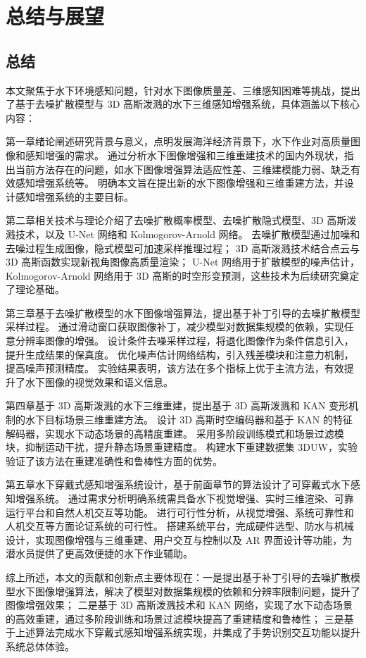 \chapter{总结与展望}
\section{总结}
本文聚焦于水下环境感知问题，针对水下图像质量差、三维感知困难等挑战，提出了基于去噪扩散模型与 3D 高斯泼溅的水下三维感知增强系统，具体涵盖以下核心内容：

第一章绪论阐述研究背景与意义，点明发展海洋经济背景下，水下作业对高质量图像和感知增强的需求。
通过分析水下图像增强和三维重建技术的国内外现状，指出当前方法存在的问题，如水下图像增强算法适应性差、三维建模能力弱、缺乏有效感知增强系统等。
明确本文旨在提出新的水下图像增强和三维重建方法，并设计感知增强系统的主要目标。

第二章相关技术与理论介绍了去噪扩散概率模型、去噪扩散隐式模型、3D 高斯泼溅技术，以及 U-Net 网络和 Kolmogorov-Arnold 网络。
去噪扩散模型通过加噪和去噪过程生成图像，隐式模型可加速采样推理过程；
3D 高斯泼溅技术结合点云与 3D 高斯函数实现新视角图像高质量渲染；
U-Net 网络用于扩散模型的噪声估计，Kolmogorov-Arnold 网络用于 3D 高斯的时空形变预测，这些技术为后续研究奠定了理论基础。

第三章基于去噪扩散模型的水下图像增强算法，提出基于补丁引导的去噪扩散模型采样过程。
通过滑动窗口获取图像补丁，减少模型对数据集规模的依赖，实现任意分辨率图像的增强。
设计条件去噪采样过程，将退化图像作为条件信息引入，提升生成结果的保真度。
优化噪声估计网络结构，引入残差模块和注意力机制，提高噪声预测精度。
实验结果表明，该方法在多个指标上优于主流方法，有效提升了水下图像的视觉效果和语义信息。

第四章基于 3D 高斯泼溅的水下三维重建，提出基于 3D 高斯泼溅和 KAN 变形机制的水下目标场景三维重建方法。
设计 3D 高斯时空编码器和基于 KAN 的特征解码器，实现水下动态场景的高精度重建。
采用多阶段训练模式和场景过滤模块，抑制运动干扰，提升静态场景重建精度。
构建水下重建数据集 3DUW，实验验证了该方法在重建准确性和鲁棒性方面的优势。

第五章水下穿戴式感知增强系统设计，基于前面章节的算法设计了可穿戴式水下感知增强系统。
通过需求分析明确系统需具备水下视觉增强、实时三维渲染、可靠运行平台和自然人机交互等功能。
进行可行性分析，从视觉增强、系统可靠性和人机交互等方面论证系统的可行性。
搭建系统平台，完成硬件选型、防水与机械设计，实现图像增强与三维重建、用户交互与控制以及 AR 界面设计等功能，为潜水员提供了更高效便捷的水下作业辅助。

综上所述，本文的贡献和创新点主要体现在：一是提出基于补丁引导的去噪扩散模型水下图像增强算法，解决了模型对数据集规模的依赖和分辨率限制问题，提升了图像增强效果；
二是基于 3D 高斯泼溅技术和 KAN 网络，实现了水下动态场景的高效重建，通过多阶段训练和场景过滤模块提高了重建精度和鲁棒性；
三是基于上述算法完成水下穿戴式感知增强系统实现，并集成了手势识别交互功能以提升系统总体体验。

